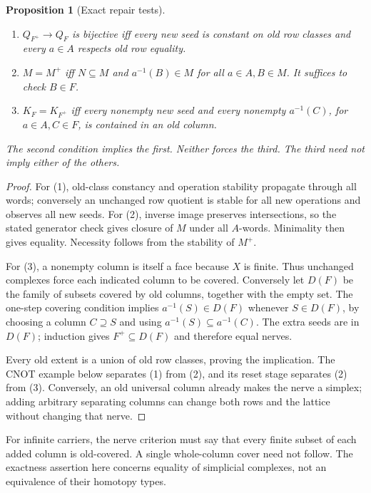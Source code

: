\documentclass[11pt]{article}
\newtheorem{proposition}[theorem]{Proposition}
\theoremstyle{definition}\newtheorem{definition}[theorem]{Definition}
\theoremstyle{remark}\newtheorem{remark}[theorem]{Remark}
\begin{document}
\begin{proposition}[Exact repair tests]
\begin{enumerate}
\item $Q_{F^+}\to Q_F$ is bijective iff every new seed is constant on
old row classes and every $a\in A$ respects old row equality.
\item $M=M^+$ iff $N\subseteq M$ and
$a^{-1}(B)\in M$ for all $a\in A,B\in M$. It suffices to check
$B\in F$.
\item $K_F=K_{F^+}$ iff every nonempty new seed and every nonempty
$a^{-1}(C)$, for $a\in A,C\in F$, is contained in an old column.
\end{enumerate}
The second condition implies the first. Neither forces the third.
The third need not imply either of the others.
\end{proposition}
\begin{proof}
For (1), old-class constancy and operation stability propagate through
all words; conversely an unchanged row quotient is stable for all
new operations and observes all new seeds. For (2), inverse image
preserves intersections, so the stated generator check gives closure
of $M$ under all $A$-words. Minimality then gives equality. Necessity
follows from the stability of $M^+$.

For (3), a nonempty column is itself a face because $X$ is finite.
Thus unchanged complexes force each indicated column to be covered.
Conversely let $D(F)$ be the family of subsets covered by old columns,
together with the empty set. The one-step covering condition implies
$a^{-1}(S)\in D(F)$ whenever $S\in D(F)$, by choosing a column
$C\supseteq S$ and using
$a^{-1}(S)\subseteq a^{-1}(C)$. The extra seeds are in $D(F)$;
induction gives $F^+\subseteq D(F)$ and therefore equal nerves.

Every old extent is a union of old row classes, proving the implication.
The CNOT example below separates (1) from (2), and its reset stage
separates (2) from (3). Conversely, an old universal column already
makes the nerve a simplex; adding arbitrary separating columns can
change both rows and the lattice without changing that nerve.
\end{proof}
For infinite carriers, the nerve criterion must say that every finite
subset of each added column is old-covered. A single whole-column
cover need not follow. The exactness assertion here concerns equality
of simplicial complexes, not an equivalence of their homotopy types.
\end{document}
